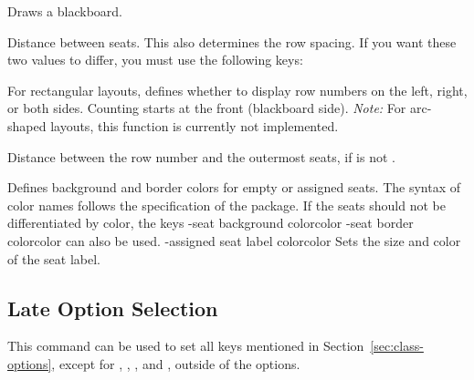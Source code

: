 \documentclass[
babel-options={english},
load-preamble-,
title=compact
]{cnltx-doc}
\begin{document}
\begin{options}
  Draws a blackboard.

  \Default{2pt}
  Distance between seats. This also determines the row spacing.
  If you want these two values to differ, you must use the following keys:

  \Default*{2pt}\vspace{-.3\baselineskip}
  \Default{2pt}

  For rectangular layouts, defines whether to display row numbers on the left, right, or both sides.
  Counting starts at the front (blackboard side).\newline
  \emph{Note:} For arc-shaped layouts, this function is currently not implemented.

  \Default{2pt}
  Distance between the row number and the outermost seats,
  if  is not .

  \vspace{-.3\baselineskip}
  \vspace{-.3\baselineskip}
  \vspace{-.3\baselineskip}
  Defines background and border colors for empty or assigned seats.
  The syntax of color names follows the specification of the 
  package.
  If the seats should not be differentiated by color, the keys
  \keyval-{seat background color}{color}\Default*\vspace{-.3\baselineskip}
  \keyval-{seat border color}{color}\Default
  can also be used.
  \vspace{-.3\baselineskip}
  \keyval-{assigned seat label color}{color}
  Sets the size and color of the seat label.
\end{options}

\subsection{Late Option Selection}
\label{sec:late-options}
\begin{commands}
  This command can be used to set all keys mentioned in
  Section~\ref{sec:class-options}, except for
  , , , and ,
  outside of the  options.
\end{commands}
\end{document}
